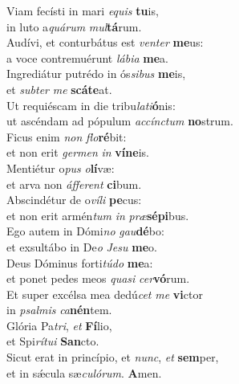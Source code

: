 \oddverse Viam fecísti in mari \textit{e}\textit{quis} \textbf{tu}is,~\*\\
\oddverse in luto a\textit{quá}\textit{rum} \textit{mul}\textbf{tá}rum.\\
\evenverse Audívi, et conturbátus est \textit{ven}\textit{ter} \textbf{me}us:~\*\\
\evenverse a voce contremuérunt \textit{lá}\textit{bi}\textit{a} \textbf{me}a.\\
\oddverse Ingrediátur putrédo in ós\textit{si}\textit{bus} \textbf{me}is,~\*\\
\oddverse et \textit{sub}\textit{ter} \textit{me} \textbf{scá}\textbf{te}at.\\
\evenverse Ut requiéscam in die tribu\textit{la}\textit{ti}\textbf{ó}nis:~\*\\
\evenverse ut ascéndam ad pópulum \textit{ac}\textit{cín}\textit{ctum} \textbf{no}strum.\\
\oddverse Ficus enim \textit{non} \textit{flo}\textbf{ré}bit:~\*\\
\oddverse et non erit \textit{ger}\textit{men} \textit{in} \textbf{ví}\textbf{ne}is.\\
\evenverse Mentiétur o\textit{pus} \textit{o}\textbf{lí}væ:~\*\\
\evenverse et arva non \textit{áf}\textit{fe}\textit{rent} \textbf{ci}bum.\\
\oddverse Abscindétur de o\textit{ví}\textit{li} \textbf{pe}cus:~\*\\
\oddverse et non erit armén\textit{tum} \textit{in} \textit{præ}\textbf{sé}\textbf{pi}bus.\\
\evenverse Ego autem in Dómi\textit{no} \textit{gau}\textbf{dé}bo:~\*\\
\evenverse et exsultábo in De\textit{o} \textit{Je}\textit{su} \textbf{me}o.\\
\oddverse Deus Dóminus forti\textit{tú}\textit{do} \textbf{me}a:~\*\\
\oddverse et ponet pedes meos \textit{qua}\textit{si} \textit{cer}\textbf{vó}rum.\\
\evenverse Et super excélsa mea dedú\textit{cet} \textit{me} \textbf{vi}ctor~\*\\
\evenverse in \textit{psal}\textit{mis} \textit{ca}\textbf{nén}tem.\\
\oddverse Glória Pa\textit{tri}, \textit{et} \textbf{Fí}lio,~\*\\
\oddverse et Spi\textit{rí}\textit{tu}\textit{i} \textbf{San}cto.\\
\evenverse Sicut erat in princípio, et \textit{nunc}, \textit{et} \textbf{sem}per,~\*\\
\evenverse et in sǽcula sæ\textit{cu}\textit{ló}\textit{rum}. \textbf{A}men.\\
